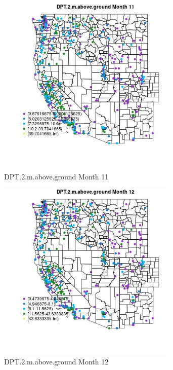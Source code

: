 \begin{figure} 
\centering  
\includegraphics[width=0.77\textwidth]{Code_Outputs/ML_input_report_ML_input_PM25_Step5_part_d_de_duplicated_aves_ML_input_MapObsMo11DPT2maboveground.jpg} 
\caption{\label{fig:ML_input_report_ML_input_PM25_Step5_part_d_de_duplicated_aves_ML_inputMapObsMo11DPT2maboveground}DPT.2.m.above.ground Month 11} 
\end{figure} 
 

\begin{figure} 
\centering  
\includegraphics[width=0.77\textwidth]{Code_Outputs/ML_input_report_ML_input_PM25_Step5_part_d_de_duplicated_aves_ML_input_MapObsMo12DPT2maboveground.jpg} 
\caption{\label{fig:ML_input_report_ML_input_PM25_Step5_part_d_de_duplicated_aves_ML_inputMapObsMo12DPT2maboveground}DPT.2.m.above.ground Month 12} 
\end{figure} 
 

